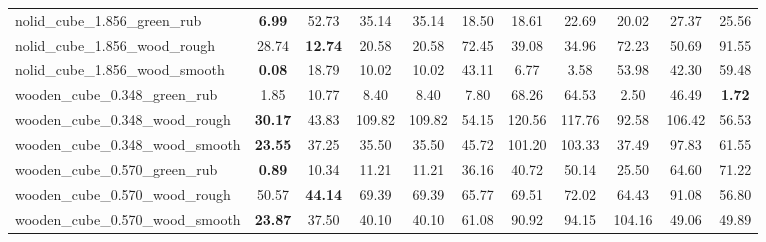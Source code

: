 \begin{table}[H]
{\begin{tabular}{l cccccccccc}
        nolid\_cube\_1.856\_green\_rub & \textbf{6.99} & 52.73 & 35.14 & 35.14 & 18.50 & 18.61 & 22.69 & 20.02 & 27.37 & 25.56 \\
        nolid\_cube\_1.856\_wood\_rough & 28.74 & \textbf{12.74} & 20.58 & 20.58 & 72.45 & 39.08 & 34.96 & 72.23 & 50.69 & 91.55 \\
        nolid\_cube\_1.856\_wood\_smooth & \textbf{0.08} & 18.79 & 10.02 & 10.02 & 43.11 & 6.77 & 3.58 & 53.98 & 42.30 & 59.48 \\
        wooden\_cube\_0.348\_green\_rub & 1.85 & 10.77 & 8.40 & 8.40 & 7.80 & 68.26 & 64.53 & 2.50 & 46.49 & \textbf{1.72} \\
        wooden\_cube\_0.348\_wood\_rough & \textbf{30.17} & 43.83 & 109.82 & 109.82 & 54.15 & 120.56 & 117.76 & 92.58 & 106.42 & 56.53 \\
        wooden\_cube\_0.348\_wood\_smooth & \textbf{23.55} & 37.25 & 35.50 & 35.50 & 45.72 & 101.20 & 103.33 & 37.49 & 97.83 & 61.55 \\
        wooden\_cube\_0.570\_green\_rub & \textbf{0.89} & 10.34 & 11.21 & 11.21 & 36.16 & 40.72 & 50.14 & 25.50 & 64.60 & 71.22 \\
        wooden\_cube\_0.570\_wood\_rough & 50.57 & \textbf{44.14} & 69.39 & 69.39 & 65.77 & 69.51 & 72.02 & 64.43 & 91.08 & 56.80 \\
        wooden\_cube\_0.570\_wood\_smooth & \textbf{23.87} & 37.50 & 40.10 & 40.10 & 61.08 & 90.92 & 94.15 & 104.16 & 49.06 & 49.89 \\
        \bottomrule
    \end{tabular}
    }
\end{table}
